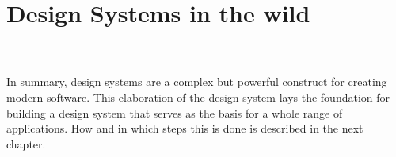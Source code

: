 \newpage
\section{Design Systems in the wild}

%
\\
\\
In summary, design systems are a complex but powerful construct for creating modern software. This elaboration of the design system lays the foundation for building a design system that serves as the basis for a whole range of applications. How and in which steps this is done is described in the next chapter.